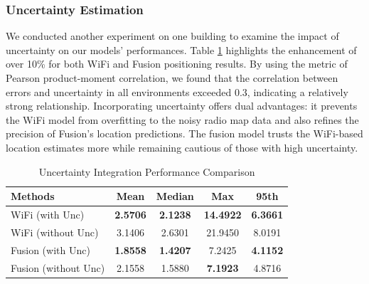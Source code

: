 
\subsubsection{Uncertainty Estimation}

We conducted another experiment on one building to examine the impact of uncertainty on our models' performances. Table \ref{tab:unc-res} highlights the enhancement of over 10\% for both WiFi and Fusion positioning results. By using the metric of Pearson product-moment correlation, we found that the correlation between errors and uncertainty in all environments exceeded 0.3, indicating a relatively strong relationship. Incorporating uncertainty offers dual advantages: it prevents the WiFi model from overfitting to the noisy radio map data and also refines the precision of Fusion's location predictions. The fusion model trusts the WiFi-based location estimates more while remaining cautious of those with high uncertainty.


\begin{table}
    \centering
    \caption{Uncertainty Integration Performance Comparison}
    \label{tab:unc-res}
    \begin{threeparttable}
    
\begin{tabular}{l|cccc}
\hline
Methods                    
                                           & Mean   & Median & Max     & 95th                  \\ \hline
WiFi (with Unc)                            & \textbf{2.5706} & \textbf{2.1238} & \textbf{14.4922} & \textbf{6.3661}               \\ 
WiFi (without Unc)                         & 3.1406 & 2.6301 & 21.9450 & 8.0191              \\ 
Fusion (with Unc)                          & \textbf{1.8558} &  \textbf{1.4207}    &    7.2425     & \textbf{4.1152}    \\ 
Fusion (without Unc)                       & 2.1558 &   1.5880  & \textbf{7.1923}        &    4.8716    \\ \hline
\end{tabular}
    \end{threeparttable}     
\end{table}





